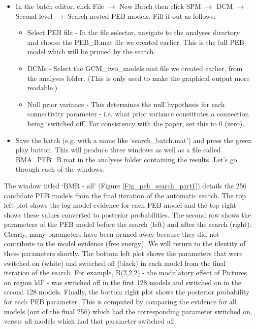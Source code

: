 \documentclass{article}
\begin{document}
\begin{itemize}
    \item In the batch editor, click File $\rightarrow$ New Batch then click SPM $\rightarrow$ DCM $\rightarrow$ Second level $\rightarrow$ Search nested PEB models. Fill it out as follows:
    \begin{itemize}
        \item Select PEB file - In the file selector, navigate to the analyses directory and choose the PEB\_B.mat file we created earlier. This is the full PEB model which will be pruned by the search.
        \item DCMs - Select the GCM\_two\_models.mat file we created earlier, from the analyses folder. (This is only used to make the graphical output more readable.)
        \item Null prior variance - This determines the null hypothesis for each connectivity parameter - i.e. what prior variance constitutes a connection being `switched off'. For consistency with the paper, set this to 0 (zero).
    \end{itemize}
    \item Save the batch (e.g. with a name like `search\_batch.mat') and press the green play button. This will produce three windows as well as a file called BMA\_PEB\_B.mat in the analyses folder containing the results. Let's go through each of the windows.
\end{itemize}

The window titled `BMR - all' (Figure \ref{Fig_peb_search_part1}) details the 256 candidate PEB models from the final iteration of the automatic search. The top left plot shows the log model evidence for each PEB model and the top right shows these values converted to posterior probabilities. The second row shows the parameters of the PEB model before the search (left) and after the search (right). Clearly, many parameters have been pruned away because they did not contribute to the model evidence (free energy). We will return to the identity of these parameters shortly. The bottom left plot shows the parameters that were switched on (white) and switched off (black) in each model from the final iteration of the search. For example, B(2,2,2) - the modulatory effect of Pictures on region ldF - was switched off in the first 128 models and switched on in the second 128 models. Finally, the bottom right plot shows the posterior probability for each PEB parameter. This is computed by comparing the evidence for all models (out of the final 256) which had the corresponding parameter switched on, versus all models which had that parameter switched off.
\end{document}
